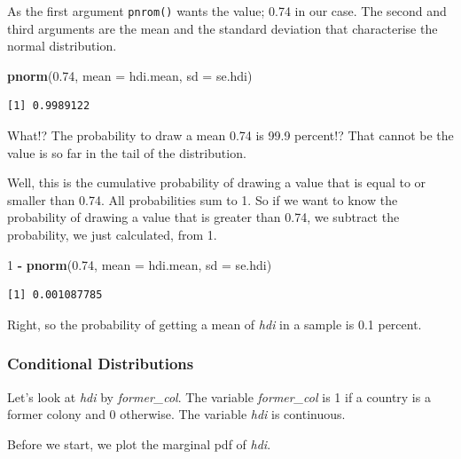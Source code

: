 \documentclass[]{article}
\newenvironment{Shaded}{\begin{snugshade}}{\end{snugshade}}
\newcommand{\KeywordTok}[1]{\textcolor[rgb]{0.13,0.29,0.53}{\textbf{#1}}}
\newcommand{\DataTypeTok}[1]{\textcolor[rgb]{0.13,0.29,0.53}{#1}}
\newcommand{\DecValTok}[1]{\textcolor[rgb]{0.00,0.00,0.81}{#1}}
\newcommand{\FloatTok}[1]{\textcolor[rgb]{0.00,0.00,0.81}{#1}}
\newcommand{\StringTok}[1]{\textcolor[rgb]{0.31,0.60,0.02}{#1}}
\newcommand{\OperatorTok}[1]{\textcolor[rgb]{0.81,0.36,0.00}{\textbf{#1}}}
\newcommand{\NormalTok}[1]{#1}
\theoremstyle{definition}
\theoremstyle{definition}
\theoremstyle{definition}
\theoremstyle{remark}
\begin{document}
As the first argument \texttt{pnrom()} wants the value; 0.74 in our
case. The second and third arguments are the mean and the standard
deviation that characterise the normal distribution.

\begin{Shaded}
\begin{Highlighting}[]
\KeywordTok{pnorm}\NormalTok{(}\FloatTok{0.74}\NormalTok{, }\DataTypeTok{mean =}\NormalTok{ hdi.mean, }\DataTypeTok{sd =}\NormalTok{ se.hdi)}
\end{Highlighting}
\end{Shaded}

\begin{verbatim}
[1] 0.9989122
\end{verbatim}

What!? The probability to draw a mean 0.74 is 99.9 percent!? That cannot
be the value is so far in the tail of the distribution.

Well, this is the cumulative probability of drawing a value that is
equal to or smaller than 0.74. All probabilities sum to 1. So if we want
to know the probability of drawing a value that is greater than 0.74, we
subtract the probability, we just calculated, from 1.

\begin{Shaded}
\begin{Highlighting}[]
\DecValTok{1} \OperatorTok{-}\StringTok{ }\KeywordTok{pnorm}\NormalTok{(}\FloatTok{0.74}\NormalTok{, }\DataTypeTok{mean =}\NormalTok{ hdi.mean, }\DataTypeTok{sd =}\NormalTok{ se.hdi)}
\end{Highlighting}
\end{Shaded}

\begin{verbatim}
[1] 0.001087785
\end{verbatim}

Right, so the probability of getting a mean of \emph{hdi} in a sample is
0.1 percent.

\subsubsection{Conditional
Distributions}\label{conditional-distributions}

Let's look at \emph{hdi} by \emph{former\_col}. The variable
\emph{former\_col} is 1 if a country is a former colony and 0 otherwise.
The variable \emph{hdi} is continuous.

Before we start, we plot the marginal pdf of \emph{hdi}.
\end{document}
